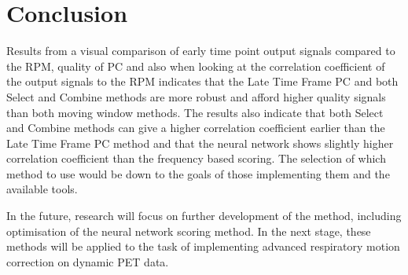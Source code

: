 \section{Conclusion} \label{sec:conclusion}
    Results from a visual comparison of early time point output signals compared to the \gls{RPM}, quality of \gls{PC} and also when looking at the correlation coefficient of the output signals to the \gls{RPM} indicates that the Late Time Frame \gls{PC} and both Select and Combine methods are more robust and afford higher quality signals than both moving window methods. The results also indicate that both Select and Combine methods can give a higher correlation coefficient earlier than the Late Time Frame \gls{PC} method and that the neural network shows slightly higher correlation coefficient than the frequency based scoring. The selection of which method to use would be down to the goals of those implementing them and the available tools.
    
    In the future, research will focus on further development of the method, including optimisation of the neural network scoring method. In the next stage, these methods will be applied to the task of implementing advanced respiratory motion correction on dynamic \gls{PET} data.